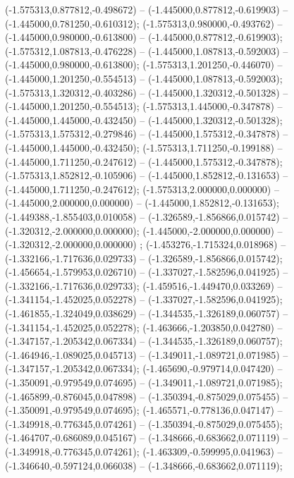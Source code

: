  (-1.575313,0.877812,-0.498672) -- (-1.445000,0.877812,-0.619903) -- (-1.445000,0.781250,-0.610312);
 (-1.575313,0.980000,-0.493762) -- (-1.445000,0.980000,-0.613800) -- (-1.445000,0.877812,-0.619903);
 (-1.575312,1.087813,-0.476228) -- (-1.445000,1.087813,-0.592003) -- (-1.445000,0.980000,-0.613800);
 (-1.575313,1.201250,-0.446070) -- (-1.445000,1.201250,-0.554513) -- (-1.445000,1.087813,-0.592003);
 (-1.575313,1.320312,-0.403286) -- (-1.445000,1.320312,-0.501328) -- (-1.445000,1.201250,-0.554513);
 (-1.575313,1.445000,-0.347878) -- (-1.445000,1.445000,-0.432450) -- (-1.445000,1.320312,-0.501328);
 (-1.575313,1.575312,-0.279846) -- (-1.445000,1.575312,-0.347878) -- (-1.445000,1.445000,-0.432450);
 (-1.575313,1.711250,-0.199188) -- (-1.445000,1.711250,-0.247612) -- (-1.445000,1.575312,-0.347878);
 (-1.575313,1.852812,-0.105906) -- (-1.445000,1.852812,-0.131653) -- (-1.445000,1.711250,-0.247612);
 (-1.575313,2.000000,0.000000) -- (-1.445000,2.000000,0.000000) -- (-1.445000,1.852812,-0.131653);
 (-1.449388,-1.855403,0.010058) -- (-1.326589,-1.856866,0.015742) -- (-1.320312,-2.000000,0.000000);
 (-1.445000,-2.000000,0.000000) -- (-1.320312,-2.000000,0.000000) ;
 (-1.453276,-1.715324,0.018968) -- (-1.332166,-1.717636,0.029733) -- (-1.326589,-1.856866,0.015742);
 (-1.456654,-1.579953,0.026710) -- (-1.337027,-1.582596,0.041925) -- (-1.332166,-1.717636,0.029733);
 (-1.459516,-1.449470,0.033269) -- (-1.341154,-1.452025,0.052278) -- (-1.337027,-1.582596,0.041925);
 (-1.461855,-1.324049,0.038629) -- (-1.344535,-1.326189,0.060757) -- (-1.341154,-1.452025,0.052278);
 (-1.463666,-1.203850,0.042780) -- (-1.347157,-1.205342,0.067334) -- (-1.344535,-1.326189,0.060757);
 (-1.464946,-1.089025,0.045713) -- (-1.349011,-1.089721,0.071985) -- (-1.347157,-1.205342,0.067334);
 (-1.465690,-0.979714,0.047420) -- (-1.350091,-0.979549,0.074695) -- (-1.349011,-1.089721,0.071985);
 (-1.465899,-0.876045,0.047898) -- (-1.350394,-0.875029,0.075455) -- (-1.350091,-0.979549,0.074695);
 (-1.465571,-0.778136,0.047147) -- (-1.349918,-0.776345,0.074261) -- (-1.350394,-0.875029,0.075455);
 (-1.464707,-0.686089,0.045167) -- (-1.348666,-0.683662,0.071119) -- (-1.349918,-0.776345,0.074261);
 (-1.463309,-0.599995,0.041963) -- (-1.346640,-0.597124,0.066038) -- (-1.348666,-0.683662,0.071119);
